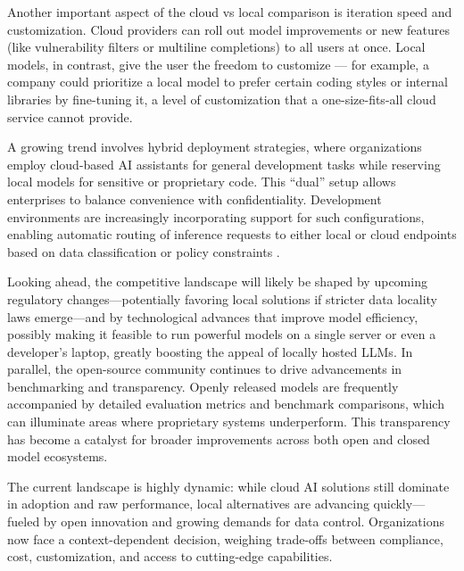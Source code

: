 Another important aspect of the cloud vs local comparison is iteration speed and customization. Cloud providers can roll out model improvements or new features (like vulnerability filters or multiline completions) to all users at once. Local models, in contrast, give the user the freedom to customize — for example, a company could prioritize a local model to prefer certain coding styles or internal libraries by fine-tuning it, a level of customization that a one-size-fits-all cloud service cannot provide.

A growing trend involves hybrid deployment strategies, where organizations employ cloud-based \gls{AI} assistants for general development tasks while reserving local models for sensitive or proprietary code. This “dual” setup allows enterprises to balance convenience with confidentiality. Development environments are increasingly incorporating support for such configurations, enabling automatic routing of inference requests to either local or cloud endpoints based on data classification or policy constraints \autocite{PALO}.

Looking ahead, the competitive landscape will likely be shaped by upcoming regulatory changes—potentially favoring local solutions if stricter data locality laws emerge—and by technological advances that improve model efficiency, possibly making it feasible to run powerful models on a single server or even a developer’s laptop, greatly boosting the appeal of locally hosted \glspl{LLM}. In parallel, the open-source community continues to drive advancements in benchmarking and transparency. Openly released models are frequently accompanied by detailed evaluation metrics and benchmark comparisons, which can illuminate areas where proprietary systems underperform. This transparency has become a catalyst for broader improvements across both open and closed model ecosystems.

The current landscape is highly dynamic: while cloud \gls{AI} solutions still dominate in adoption and raw performance, local alternatives are advancing quickly—fueled by open innovation and growing demands for data control. Organizations now face a context-dependent decision, weighing trade-offs between compliance, cost, customization, and access to cutting-edge capabilities.

